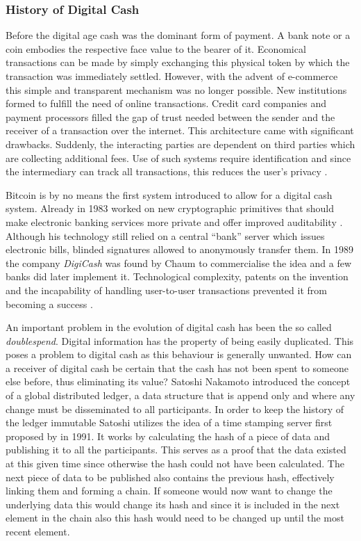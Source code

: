 \documentclass[final]{fhnwreport}       %
\begin{document}
\subsubsection{History of Digital Cash}
Before the digital age cash was the dominant form of payment. A bank note or a coin embodies the respective face value to the bearer of it. Economical transactions can be made by simply exchanging this physical token by which the transaction was immediately settled. However, with the advent of e-commerce this simple and transparent mechanism was no longer possible. New institutions formed to fulfill the need of online transactions. Credit card companies and payment processors filled the gap of trust needed between the sender and the receiver of a transaction over the internet. This architecture came with significant drawbacks. Suddenly, the interacting parties are dependent on third parties which are collecting additional fees. Use of such systems require identification and since the intermediary can track all transactions, this reduces the user's privacy \citep{narayanan_bitcoin_2016}.

Bitcoin is by no means the first system introduced to allow for a digital cash system. Already in 1983 \citeauthor{chaum_blind_1983} worked on new cryptographic primitives that should make electronic banking services more private and offer improved auditability \citep{chaum_blind_1983}. Although his technology still relied on a central ``bank'' server which issues electronic bills, blinded signatures allowed to anonymously transfer them. In 1989 the company \emph{DigiCash} was found by Chaum to commercialise the idea and a few banks did later implement it. Technological complexity, patents on the invention and the incapability of handling  user-to-user transactions prevented it from becoming a success \citep{narayanan_bitcoin_2016}. 

An important problem in the evolution of digital cash has been the so called \emph{\gls{doublespend}}. Digital information has the property of being easily duplicated. This poses a problem to digital cash as this behaviour is generally unwanted. How can a receiver of digital cash be certain that the cash has not been spent to someone else before, thus eliminating its value? Satoshi Nakamoto introduced the concept of a global distributed ledger, a data structure that is append only and where any change must be disseminated to all participants. In order to keep the history of the ledger immutable Satoshi utilizes the idea of a time stamping server first proposed by \textcite{haber_how_1991} in 1991. It works by calculating the \gls{hash} of a piece of data and publishing it to all the participants. This serves as a proof that the data existed at this given time since otherwise the \gls{hash} could not have been calculated. The next piece of data to be published also contains the previous \gls{hash}, effectively linking them and forming a chain. If someone would now want to change the underlying data this would change its \gls{hash} and since it is included in the next element in the chain also this \gls{hash} would need to be changed up until the most recent element. 
\end{document}

